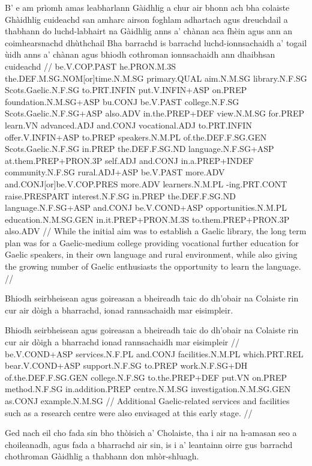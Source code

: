 \documentclass[a4paper,10pt]{article}
\begin{document}
\vspace{4mm}
\gla B' e am prìomh amas leabharlann Gàidhlig a chur air bhonn ach bha colaiste Ghàidhlig cuideachd san amharc airson foghlam adhartach agus dreuchdail a thabhann do luchd-labhairt na Gàidhlig anns a' chànan aca fhèin agus {ann an} coimhearsnachd dhùthchail Bha barrachd is barrachd luchd-ionnsachaidh a' togail ùidh anns a' chànan agus bhiodh cothroman ionnsachaidh ann dhaibhsan cuideachd  //
\glb be.V.COP.PAST he.PRON.M.3S the.DEF.M.SG.NOM[or]time.N.M.SG primary.QUAL aim.N.M.SG library.N.F.SG Scots.Gaelic.N.F.SG to.PRT.INFIN put.V.INFIN+ASP on.PREP foundation.N.M.SG+ASP bu.CONJ be.V.PAST college.N.F.SG Scots.Gaelic.N.F.SG+ASP also.ADV in.the.PREP+DEF view.N.M.SG for.PREP learn.VN advanced.ADJ and.CONJ vocational.ADJ to.PRT.INFIN offer.V.INFIN+ASP to.PREP speakers.N.M.PL of.the.DEF.F.SG.GEN Scots.Gaelic.N.F.SG in.PREP the.DEF.F.SG.ND language.N.F.SG+ASP at.them.PREP+PRON.3P self.ADJ and.CONJ in.a.PREP+INDEF community.N.F.SG rural.ADJ+ASP be.V.PAST more.ADV and.CONJ[or]be.V.COP.PRES more.ADV learners.N.M.PL -ing.PRT.CONT raise.PRESPART interest.N.F.SG in.PREP the.DEF.F.SG.ND language.N.F.SG+ASP and.CONJ be.V.COND+ASP opportunities.N.M.PL education.N.M.SG.GEN in.it.PREP+PRON.M.3S to.them.PREP+PRON.3P also.ADV  //
\glft While the initial aim was to establish a Gaelic library, the long term plan was for a Gaelic-medium college providing vocational further education for Gaelic speakers, in their own language and rural environment, while also giving the growing number of Gaelic enthusiasts the opportunity to learn the language. //
\endgl
\xe

\ex
\begingl
\glpre Bhiodh seirbheisean agus goireasan a bheireadh taic do dh'obair na Colaiste rin cur air dòigh a bharrachd, ionad rannsachaidh mar eisimpleir. 

\vspace{4mm}
\gla Bhiodh seirbheisean agus goireasan a bheireadh taic do dh'obair na Colaiste rin cur air dòigh {a bharrachd} ionad rannsachaidh mar eisimpleir  //
\glb be.V.COND+ASP services.N.F.PL and.CONJ facilities.N.M.PL which.PRT.REL bear.V.COND+ASP support.N.F.SG to.PREP work.N.F.SG+DH of.the.DEF.F.SG.GEN college.N.F.SG to.the.PREP+DEF put.VN on.PREP method.N.F.SG in.addition.PREP centre.N.M.SG investigation.N.M.SG.GEN as.CONJ example.N.M.SG  //
\glft Additional Gaelic-related services and facilities such as a research centre were also envisaged at this early stage. //
\endgl
\xe

\ex
\begingl
\glpre Ged nach eil cho fada sin bho thòisich a' Cholaiste, tha i air na h-amasan seo a choileanadh, agus fada a bharrachd air sin, is i a' leantainn oirre gus barrachd chothroman Gàidhlig a thabhann don mhòr-shluagh. 
\end{document}
